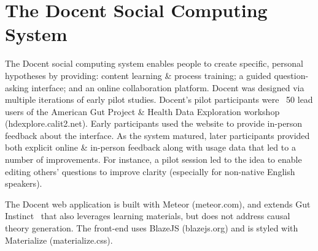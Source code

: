 
\section{The Docent Social Computing System}
The Docent social computing system enables people to create specific, personal hypotheses by providing: content learning \& process training; a guided question-asking interface; and an online collaboration platform. Docent was designed via multiple iterations of early pilot studies. Docent’s pilot participants were ~50 lead users of the American Gut Project \& Health Data Exploration workshop (hdexplore.calit2.net). Early participants used the website to provide in-person feedback about the interface. As the system matured, later participants provided both explicit online \& in-person feedback along with usage data that led to a number of improvements. For instance, a pilot session led to the idea to enable editing others’ questions to improve clarity (especially for non-native English speakers).

The Docent web application is built with Meteor (meteor.com), and extends Gut Instinct~\cite{Pandey2017} that also leverages learning materials, but does not address causal theory generation. The front-end uses BlazeJS (blazejs.org) and is styled with Materialize (materialize.css).

